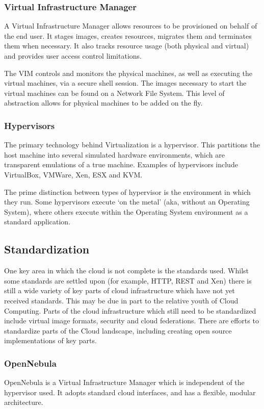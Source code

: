 \documentclass{article}
\begin{document}
\subsubsection{Virtual Infrastructure Manager}
A Virtual Infrastructure Manager allows resources to be provisioned on behalf of the end user. It stages images, creates resources, migrates them and terminates them when necessary. It also tracks resource usage (both physical and virtual) and provides user access control limitations.

The VIM controls and monitors the physical machines, as well as executing the virtual machines, via a secure shell session. The images necessary to start the virtual machines can be found on a Network File System. This level of abstraction allows for physical machines to be added on the fly.

\subsubsection{Hypervisors}
The primary technology behind Virtualization is a hypervisor. This partitions the host machine into several simulated hardware environments, which are transparent emulations of a true machine. Examples of hypervisors include VirtualBox, VMWare, Xen, ESX and KVM.

The prime distinction between types of hypervisor is the environment in which they run. Some hypervisors execute `on the metal' (aka, without an Operating System), where others execute within the Operating System environment as a standard application.

\subsection{Standardization}
One key area in which the cloud is not complete is the standards used. Whilst some standards are settled upon (for example, HTTP, REST and Xen) there is still a wide variety of key parts of cloud infrastructure which have not yet received standards. This may be due in part to the relative youth of Cloud Computing. Parts of the cloud infrastructure which still need to be standardized include virtual image formats, security and cloud federations. There are efforts to standardize parts of the Cloud landscape, including creating open source implementations of key parts.
 
\subsubsection{OpenNebula}
OpenNebula is a Virtual Infrastructure Manager which is independent of the hypervisor used. It adopts standard cloud interfaces, and has a flexible, modular architecture. 
\end{document}
